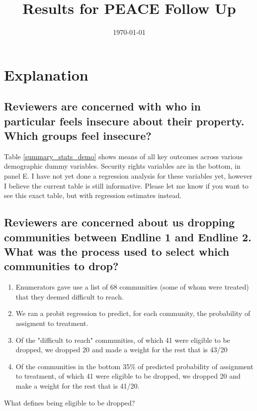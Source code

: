 \documentclass[10pt]{article}
\title{Results for PEACE Follow Up}
\date{\today}
\begin{document}
\maketitle 
\tableofcontents
\listoftables
\newpage
\clearpage

\section{Explanation}

\subsection*{Reviewers are concerned with who in particular feels insecure about their property. Which groups feel insecure?} 

\par Table \ref{summary_stats_demo} shows means of all key outcomes across various demographic dummy variables. Security rights variables are in the bottom, in panel E. I have not yet done a regression analysis for these variables yet, however I believe the current table is still informative. Please let me know if you want to see this exact table, but with regression estimates instead. 

\subsection*{Reviewers are concerned about us dropping communities between Endline 1 and Endline 2. What was the process used to select which communities to drop?}

\begin{enumerate}
    \item Enumerators gave use a list of 68 communities (some of whom were treated) that they deemed difficult to reach.
    \item We ran a probit regression to predict, for each community, the probability of assigment to treatment. 
    \item Of the "difficult to reach" communities, of which 41 were eligible to be dropped, we dropped 20 and made a weight  for the rest that is 43/20
    \item Of the communities in the bottom 35\% of predicted probability of assignment to treatment, of which 41 were eligible to be dropped, we dropped 20 and make a weight for the rest that is 41/20. 
\end{enumerate}

What defines being eligible to be dropped? 
\end{document}
